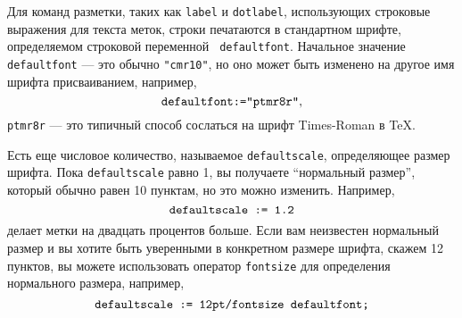 \documentclass{article} %
\newcommand\qq{"} %
\def\ttt{\texttt}  %
\begin{document}
Для команд разметки, таких как {\tt label} и {\tt dotlabel}, использующих 
строковые выражения для текста меток, строки печатаются в стандартном 
шрифте, определяемом строковой переменной {\tt
defaultfont}\label{Ddffont}.
Начальное значение {\tt defaultfont} --- это  обычно {\tt \qq{cmr10}\qq},
но оно может быть изменено на другое имя шрифта присваиванием, например, 
$$ \hbox{\tt defaultfont:=\qq{ptmr8r}\qq}, $$
\ttt{ptmr8r} --- это типичный способ сослаться на шрифт Times-Roman в \TeX.

Есть еще числовое количество, называемое {\tt defaultscale}\label{Ddfscale}, 
определяющее размер шрифта.
Пока {\tt default\-scale} равно 1, вы получаете ``нормальный размер'', 
который обычно равен 10 пунктам, но это можно изменить.
Например, 
$$ \hbox{\tt defaultscale := 1.2} $$
делает метки на двадцать процентов больше.
Если вам неизвестен нормальный размер и вы хотите быть уверенными в 
конкретном размере шрифта, скажем 12 пунктов, вы можете использовать 
оператор {\tt fontsize}\label{Dfntsiz} 
для определения нормального размера, например,
$$ \hbox{\tt defaultscale := 12pt/fontsize defaultfont;} $$
\end{document}
